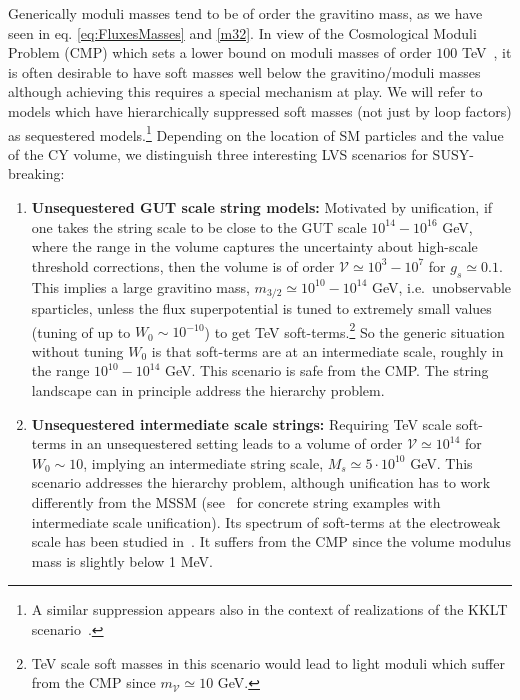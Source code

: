 \documentclass[12pt,a4paper]{book}
\begin{document}
Generically moduli masses tend to be of order the gravitino mass, as we have seen in eq. \eqref{eq:FluxesMasses} and \eqref{m32}. In view of the Cosmological Moduli Problem (CMP) which sets a lower bound on moduli masses of order $100$ TeV~\cite{Coughlan:1983ci,Banks:1993en,deCarlos:1993ja}, it is often desirable to have soft masses well below the gravitino/moduli masses although achieving this requires a special mechanism at play. We will refer to models which have hierarchically suppressed soft masses (not just by loop factors) as sequestered models.\footnote{A similar suppression appears also in the context of realizations of the KKLT scenario~\cite{Choi:2005ge}.} Depending on the location of SM particles and the value of the CY volume, we distinguish three interesting LVS scenarios for SUSY-breaking:
\begin{enumerate}
\item{\bf Unsequestered GUT scale string models:}
Motivated by unification, if one takes the string scale to be close to the GUT scale $10^{14}-10^{16}$ GeV, where the range in the volume captures the uncertainty about high-scale threshold corrections, then the volume is of order $\mathcal{V}\simeq 10^{3}-10^{7}$ for $g_s\simeq 0.1$. This implies a large gravitino mass, $m_{3/2}\simeq 10^{10}-10^{14}$ GeV, i.e.~unobservable sparticles, unless the flux superpotential is tuned to extremely small values (tuning of up to $W_0\sim 10^{-10}$) to get TeV soft-terms.\footnote{TeV scale soft masses in this scenario would lead to light moduli which suffer from the CMP since $m_\mathcal{V} \simeq 10$ GeV.} So the generic situation without tuning $W_0$ is that soft-terms are at an intermediate scale, roughly in the range $10^{10}-10^{14}$ GeV. This scenario is safe from the CMP. The string landscape can in principle address the hierarchy problem.

\item{\bf Unsequestered intermediate scale strings:}
Requiring TeV scale soft-terms in an unsequestered setting leads to a volume of order $\mathcal{V}\simeq 10^{14}$ for $W_0\sim 10$, implying an intermediate string scale, $M_s\simeq 5\cdot 10^{10}$ GeV. This scenario addresses the hierarchy problem, although unification has to work differently from the MSSM (see~\cite{Aldazabal:2000sk, Dolan:2011qu,Cicoli:2013mpa} for concrete string examples with intermediate scale unification). Its spectrum of soft-terms at the electroweak scale has been studied in~\cite{Conlon:2007xv}. It suffers from the CMP since the volume modulus mass is slightly below 1 MeV.


\end{enumerate}
\end{document}
